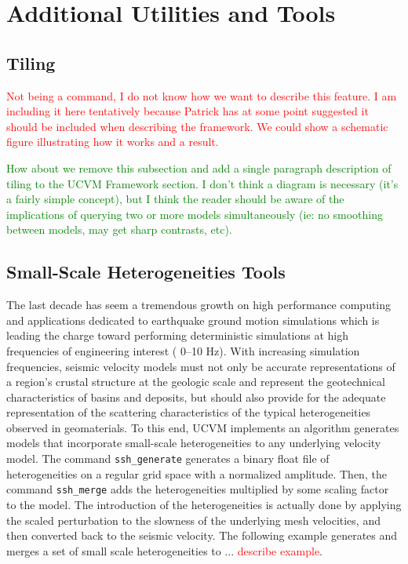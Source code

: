 
\section{Additional Utilities and Tools}
\label{sec:utilities}

\subsection{Tiling}

\textcolor{red}{Not being a command, I do not know how we want to describe this feature. I am including it here tentatively because Patrick has at some point suggested it should be included when describing the framework. We could show a schematic figure illustrating how it works and a result.}

\textcolor{green}{How about we remove this subsection and add a single paragraph description of tiling to the UCVM Framework section. I don't think a diagram is necessary (it's a fairly simple concept), but I think the reader should be aware of the implications of querying two or more models simultaneously (ie: no smoothing between models, may get sharp contrasts, etc).}

\subsection{Small-Scale Heterogeneities Tools}

The last decade has seem a tremendous growth on high performance computing and applications dedicated to earthquake ground motion simulations which is leading the charge toward performing deterministic simulations at high frequencies of engineering interest (\fmax{} 0--10 Hz). With increasing simulation frequencies, seismic velocity models must not only be accurate representations of a region's crustal structure at the geologic scale and represent the geotechnical characteristics of basins and deposits, but should also provide for the adequate representation of the scattering characteristics of the typical heterogeneities observed in geomaterials. To this end, UCVM implements an algorithm generates models that incorporate small-scale heterogeneities to any underlying velocity model. The command \texttt{ssh\_generate} generates a binary float file of heterogeneities on a regular grid space with a normalized amplitude. Then, the command \texttt{ssh\_merge} adds the heterogeneities multiplied by some scaling factor to the model. The introduction of the heterogeneities is actually done by applying the scaled perturbation to the slowness of the underlying mesh velocities, and then converted back to the seismic velocity. The following example generates and merges a set of small scale heterogeneities to ... \textcolor{red}{describe example}. 

